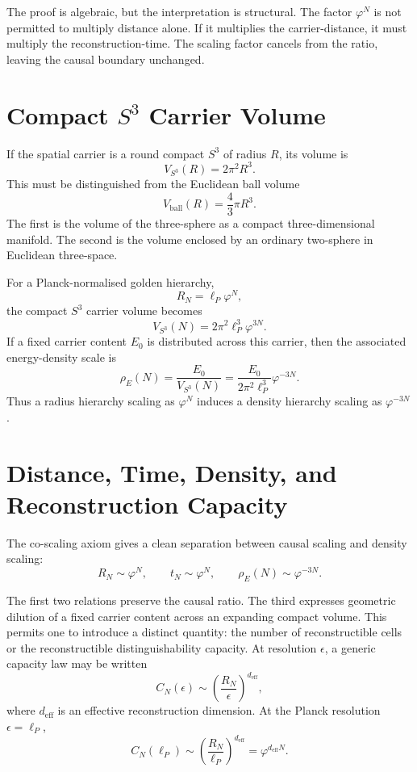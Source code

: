 \documentclass[11pt,a4paper]{article}
\newcommand{\Sthree}{S^{3}}
\newcommand{\lP}{\ell_{P}}
\newcommand{\ph}{\varphi}
\newcommand{\Vthree}{V_{S^3}}
\begin{document}
\noindent
The proof is algebraic, but the interpretation is structural.  The factor $\ph^N$
is not permitted to multiply distance alone.  If it multiplies the carrier-distance,
it must multiply the reconstruction-time.  The scaling factor cancels from the ratio,
leaving the causal boundary unchanged.

\section{Compact \texorpdfstring{$\Sthree$}{S3} Carrier Volume}

If the spatial carrier is a round compact $\Sthree$ of radius $R$, its volume is
\[
  \Vthree(R)=2\pi^2R^3.
\]
This must be distinguished from the Euclidean ball volume
\[
  V_{\mathrm{ball}}(R)=\frac{4}{3}\pi R^3.
\]
The first is the volume of the three-sphere as a compact three-dimensional manifold.
The second is the volume enclosed by an ordinary two-sphere in Euclidean three-space.

For a Planck-normalised golden hierarchy,
\[
  R_N=\lP\ph^N,
\]
the compact $\Sthree$ carrier volume becomes
\[
  \Vthree(N)=2\pi^2\lP^3\ph^{3N}.
\]
If a fixed carrier content $E_0$ is distributed across this carrier, then the associated
energy-density scale is
\[
  \rho_E(N)=\frac{E_0}{\Vthree(N)}
  =
  \frac{E_0}{2\pi^2\lP^3}\ph^{-3N}.
\]
Thus a radius hierarchy scaling as $\ph^N$ induces a density hierarchy scaling as
$\ph^{-3N}$.

\section{Distance, Time, Density, and Reconstruction Capacity}

The co-scaling axiom gives a clean separation between causal scaling and density
scaling:
\[
  R_N\sim\ph^N,\qquad
  t_N\sim\ph^N,\qquad
  \rho_E(N)\sim\ph^{-3N}.
\]

The first two relations preserve the causal ratio.  The third expresses geometric
dilution of a fixed carrier content across an expanding compact volume.  This permits
one to introduce a distinct quantity: the number of reconstructible cells or the
reconstructible distinguishability capacity.  At resolution $\epsilon$, a generic
capacity law may be written
\[
  C_N(\epsilon)\sim \left(\frac{R_N}{\epsilon}\right)^{d_{\mathrm{eff}}},
\]
where $d_{\mathrm{eff}}$ is an effective reconstruction dimension.  At the Planck
resolution $\epsilon=\lP$,
\[
  C_N(\lP)\sim \left(\frac{R_N}{\lP}\right)^{d_{\mathrm{eff}}}
  =
  \ph^{d_{\mathrm{eff}}N}.
\]
\end{document}
